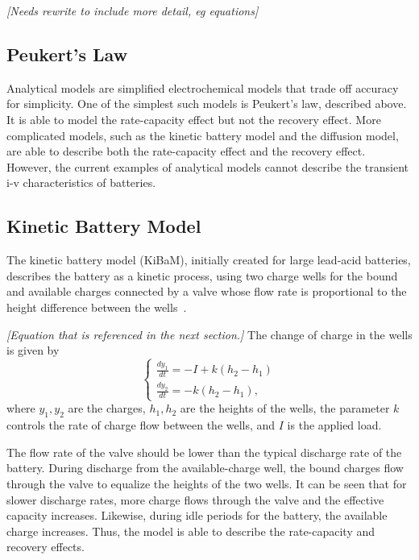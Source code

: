 \documentclass[../zhang_thesis.tex]{subfiles}
\begin{document}
\emph{[Needs rewrite to include more detail, eg equations]}

\subsection{Peukert's Law}

Analytical models are simplified electrochemical models that trade off accuracy for simplicity. One of the simplest such models is Peukert's law, described above. It is able to model the rate-capacity effect but not the recovery effect. More complicated models, such as the kinetic battery model and the diffusion model, are able to describe both the rate-capacity effect and the recovery effect. However, the current examples of analytical models cannot describe the transient i-v characteristics of batteries.

\subsection{Kinetic Battery Model}

The kinetic battery model (KiBaM), initially created for large lead-acid batteries, describes the battery as a kinetic process, using two charge wells for the bound and available charges connected by a valve whose flow rate is proportional to the height difference between the wells~\cite{manwell93}. 

\emph{[Equation that is referenced in the next section.]}
The change of charge in the wells is given by
\begin{equation}
    \begin{cases}
        \frac{dy_1}{dt} = -I + k \left( h_2 - h_1 \right) \\
        \frac{dy_2}{dt} = -k \left( h_2 - h_1 \right),
    \end{cases}
    \label{eq:kibam}
\end{equation}
where $y_1,y_2$ are the charges, $h_1,h_2$ are the heights of the wells, the parameter $k$ controls the rate of charge flow between the wells, and $I$ is the applied load.

The flow rate of the valve should be lower than the typical discharge rate of the battery. During discharge from the available-charge well, the bound charges flow through the valve to equalize the heights of the two wells. It can be seen that for slower discharge
rates, more charge flows through the valve and the effective capacity increases. Likewise, during idle periods for the battery, the available charge increases. Thus, the model is able to describe the rate-capacity and recovery effects.
\end{document}
